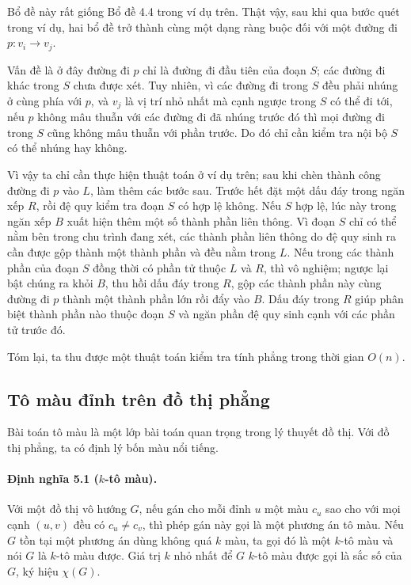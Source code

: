 \documentclass[11pt]{article}
\begin{document}
Bổ đề này rất giống Bổ đề 4.4 trong ví dụ trên. Thật vậy, sau khi qua bước quét
trong ví dụ, hai bổ đề trở thành cùng một dạng ràng buộc đối với một đường đi
$p:v_i\to v_j$.

Vấn đề là ở đây đường đi $p$ chỉ là đường đi đầu tiên của đoạn $S$; các đường
đi khác trong $S$ chưa được xét. Tuy nhiên, vì các đường đi trong $S$ đều phải
nhúng ở cùng phía với $p$, và $v_j$ là vị trí nhỏ nhất mà cạnh ngược trong $S$
có thể đi tới, nếu $p$ không mâu thuẫn với các đường đi đã nhúng trước đó thì
mọi đường đi trong $S$ cũng không mâu thuẫn với phần trước. Do đó chỉ cần kiểm
tra nội bộ $S$ có thể nhúng hay không.

Vì vậy ta chỉ cần thực hiện thuật toán ở ví dụ trên; sau khi chèn thành công
đường đi $p$ vào $L$, làm thêm các bước sau. Trước hết đặt một dấu đáy trong
ngăn xếp $R$, rồi đệ quy kiểm tra đoạn $S$ có hợp lệ không. Nếu $S$ hợp lệ, lúc
này trong ngăn xếp $B$ xuất hiện thêm một số thành phần liên thông. Vì đoạn $S$
chỉ có thể nằm bên trong chu trình đang xét, các thành phần liên thông do đệ quy
sinh ra cần được gộp thành một thành phần và đều nằm trong $L$. Nếu trong các
thành phần của đoạn $S$ đồng thời có phần tử thuộc $L$ và $R$, thì vô nghiệm;
ngược lại bật chúng ra khỏi $B$, thu hồi dấu đáy trong $R$, gộp các thành phần
này cùng đường đi $p$ thành một thành phần lớn rồi đẩy vào $B$. Dấu đáy trong
$R$ giúp phân biệt thành phần nào thuộc đoạn $S$ và ngăn phần đệ quy sinh cạnh
với các phần tử trước đó.

Tóm lại, ta thu được một thuật toán kiểm tra tính phẳng trong thời gian $O(n)$.

\subsection{Tô màu đỉnh trên đồ thị phẳng}

Bài toán tô màu là một lớp bài toán quan trọng trong lý thuyết đồ thị. Với đồ
thị phẳng, ta có định lý bốn màu nổi tiếng.

\paragraph{Định nghĩa 5.1 ($k$-tô màu).}
Với một đồ thị vô hướng $G$, nếu gán cho mỗi đỉnh $u$ một màu $c_u$ sao cho với
mọi cạnh $(u,v)$ đều có $c_u\ne c_v$, thì phép gán này gọi là một phương án tô
màu. Nếu $G$ tồn tại một phương án dùng không quá $k$ màu, ta gọi đó là một
$k$-tô màu và nói $G$ là $k$-tô màu được. Giá trị $k$ nhỏ nhất để $G$ $k$-tô
màu được gọi là sắc số của $G$, ký hiệu $\chi(G)$.
\end{document}
